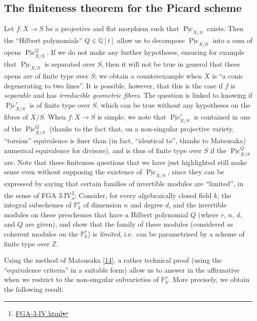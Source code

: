 \documentclass{article}
\renewcommand{\href}[2]{#2\footnote{\url{#1}}}
\newcommand{\oldpage}[1]{\marginpar{\footnotesize$\Big\vert$ \textit{p.~#1}}}
\theoremstyle{definition}
\theoremstyle{definition}
\theoremstyle{definition}
\theoremstyle{definition}
\theoremstyle{remark}
\begin{document}
\hypertarget{fga-3-vi-section-4}{%
\subsection{The finiteness theorem for the Picard scheme}\label{fga-3-vi-section-4}}

Let \(f\colon X\to S\) be a projective and flat morphism such that \(\underline{\operatorname{Pic}}_{X/S}\) exists.
Then the ``Hilbert polynomials'' \(Q\in\mathbb{Q}[t]\) allow us to decompose \(\underline{\operatorname{Pic}}_{X/S}\) into a sum of opens \(\underline{\operatorname{Pic}}_{X/S}^Q\).
If we do not make any further hypotheses, ensuring for example that \(\underline{\operatorname{Pic}}_{X/S}\) is separated over \(S\), then it will not be true in general that these opens are of finite type over \(S\);
we obtain a counterexample when \(X\) is ``a conic degenerating to two lines''.
\oldpage{236-22}It is possible, however, that this is the case if \(f\) is \emph{separable} and has \emph{irreducible geometric fibres}.
The question is linked to knowing if \(\underline{\operatorname{Pic}}_{X/S}^\tau\) is of finite type over \(S\), which can be true without any hypotheses on the fibres of \(X/S\).
When \(f\colon X\to S\) is simple, we note that \(\underline{\operatorname{Pic}}_{X/S}^\tau\) is contained in one of the \(\underline{\operatorname{Pic}}_{X/S}^Q\) (thanks to the fact that, on a non-singular projective variety, ``torsion'' equivalence is finer than (in fact, ``identical to'', thanks to Matsusaka) numerical equivalence for divisors), and is thus of finite type over \(S\) if the \(\underline{\operatorname{Pic}}_{X/S}^Q\) are.
Note that these finiteness questions that we have just highlighted still make sense even without supposing the existence of \(\underline{\operatorname{Pic}}_{X/S}\), since they can be expressed by saying that certain families of invertible modules are ``limited'', in the sense of \href{FGA-3-IV.html}{FGA 3.IV}:
Consider, for every algebraically closed field \(k\), the integral subschemes of \(\mathbb{P}_k^r\) of dimension \(n\) and degree \(d\), and the invertible modules on these preschemes that have a Hilbert polynomial \(Q\) (where \(r\), \(n\), \(d\), and \(Q\) are given), and show that the family of these modules (considered as coherent modules on the \(\mathbb{P}_k^r\)) is \emph{limited}, i.e.~can be parametrised by a scheme of finite type over \(\mathbb{Z}\).

Using the method of Matsusaka {[}\protect\hyperlink{ref-Mat1957}{14}{]}, a rather technical proof (using the ``equivalence criteria'' in a suitable form) allow us to answer in the affirmative when we restrict to the non-singular subvarieties of \(\mathbb{P}_k^r\).
More precisely, we obtain the following result:
\end{document}
